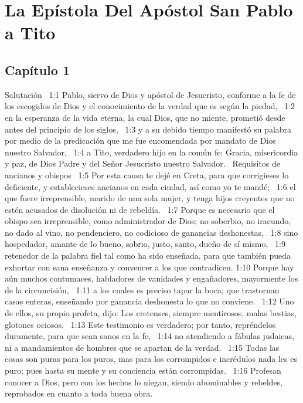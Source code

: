 \chapter{La Epístola Del Apóstol San Pablo a Tito}



\section*{Capítulo 1 }
Salutación  
1:1 Pablo, siervo de Dios y apóstol de Jesucristo, conforme a la fe de los escogidos de Dios y el conocimiento de la verdad que es según la piedad,  
1:2 en la esperanza de la vida eterna, la cual Dios, que no miente, prometió desde antes del principio de los siglos,  
1:3 y a su debido tiempo manifestó su palabra por medio de la predicación que me fue encomendada por mandato de Dios nuestro Salvador,  
1:4 a Tito, verdadero hijo en la común fe: Gracia, misericordia y paz, de Dios Padre y del Señor Jesucristo nuestro Salvador.  
Requisitos de ancianos y obispos  
1:5 Por esta causa te dejé en Creta, para que corrigieses lo deficiente, y establecieses ancianos en cada ciudad, así como yo te mandé;  
1:6 el que fuere irreprensible, marido de una sola mujer, y tenga hijos creyentes que no estén acusados de disolución ni de rebeldía.  
1:7 Porque es necesario que el obispo sea irreprensible, como administrador de Dios; no soberbio, no iracundo, no dado al vino, no pendenciero, no codicioso de ganancias deshonestas,  
1:8 sino hospedador, amante de lo bueno, sobrio, justo, santo, dueño de sí mismo,  
1:9 retenedor de la palabra fiel tal como ha sido enseñada, para que también pueda exhortar con sana enseñanza y convencer a los que contradicen. 
1:10 Porque hay aún muchos contumaces, habladores de vanidades y engañadores, mayormente los de la circuncisión,  
1:11 a los cuales es preciso tapar la boca; que trastornan casas enteras, enseñando por ganancia deshonesta lo que no conviene.  
1:12 Uno de ellos, su propio profeta, dijo: Los cretenses, siempre mentirosos, malas bestias, glotones ociosos.  
1:13 Este testimonio es verdadero; por tanto, repréndelos duramente, para que sean sanos en la fe,  
1:14 no atendiendo a fábulas judaicas, ni a mandamientos de hombres que se apartan de la verdad.  
1:15 Todas las cosas son puras para los puros, mas para los corrompidos e incrédulos nada les es puro; pues hasta su mente y su conciencia están corrompidas.  
1:16 Profesan conocer a Dios, pero con los hechos lo niegan, siendo abominables y rebeldes, reprobados en cuanto a toda buena obra.  
